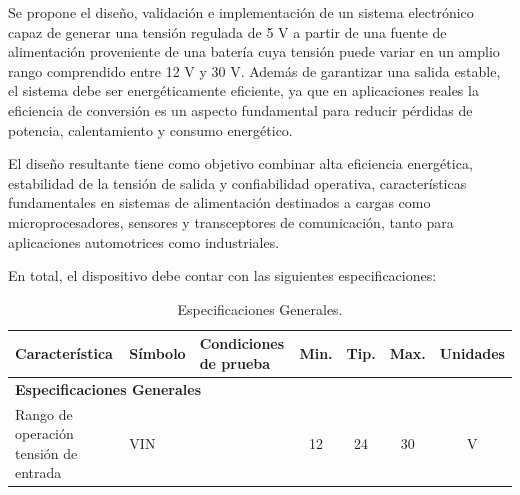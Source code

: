 \documentclass[]{article}
\begin{document}
	Se propone el diseño, validación e implementación de un sistema electrónico capaz de generar una tensión regulada de 5 V a partir de una fuente de alimentación proveniente de una batería cuya tensión puede variar en un amplio rango comprendido entre 12 V y 30 V. Además de garantizar una salida estable, el sistema debe ser energéticamente eficiente, ya que en aplicaciones reales la eficiencia de conversión es un aspecto fundamental para reducir pérdidas de potencia, calentamiento y consumo energético.
	
	
	El diseño resultante tiene como objetivo combinar alta eficiencia energética, estabilidad de la tensión de salida y confiabilidad operativa, características fundamentales en sistemas de alimentación destinados a cargas como
	microprocesadores, sensores y transceptores de comunicación, tanto para aplicaciones automotrices como industriales.
	
	En total, el dispositivo debe contar con las siguientes especificaciones:
	
	\begin{table}[h]
		\centering
		\renewcommand{\arraystretch}{1.5}
		\begin{tabular}{|p{3cm}|l|l|c|c|c|c|}
			\hline
			\textbf{Característica} & \textbf{Símbolo} & \textbf{Condiciones de prueba} & \textbf{Min.} & \textbf{Tip.} & \textbf{Max.} & \textbf{Unidades} \\
			\hline
			
			\multicolumn{7}{|l|}{\textbf{Especificaciones Generales}} \\
			\hline
			
			Rango de operación tensión de entrada & VIN &  & 12 & 24 & 30 & V \\
			\hline
			
			
			
			
		\end{tabular}
		\caption{Especificaciones Generales.}
	\end{table}
	
\end{document}
